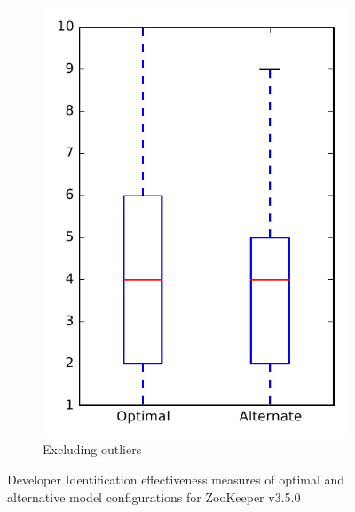\begin{figure}
\begin{subfigure}{.4\textwidth}
        \includegraphics[height=0.4\textheight]{figures/combo/dit_rq1_zookeeper_no_outlier}
        \caption{Excluding outliers}\label{fig:combo:dit:rq1:zookeeper_no_outlier}
    \end{subfigure}
\caption{Developer Identification effectiveness measures of optimal and alternative model configurations for ZooKeeper v3.5.0}
\label{fig:combo:dit:rq1:zookeeper}
\end{figure}
